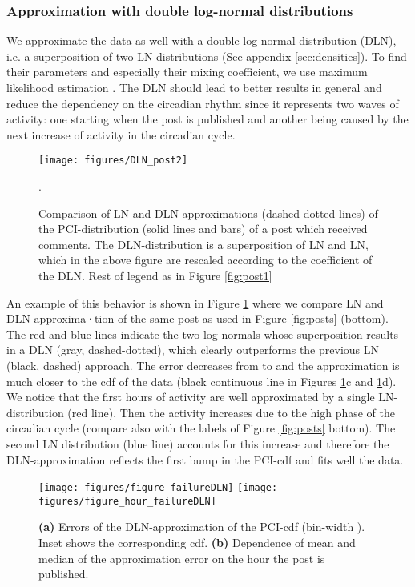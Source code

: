 \documentclass[twoside,11pt]{article}
\begin{document}
\subsubsection{Approximation with  double log-normal distributions}
\noindent 
We approximate the data as well with a double log-normal distribution
(DLN), i.e. a superposition of two LN-distributions (See appendix
\ref{sec:densities}).  To find their parameters and especially their
mixing coefficient, we use maximum likelihood estimation
\citep{Stouffer06, DeGroot2002}.  The DLN should lead to better results
in general and reduce the dependency on the circadian rhythm since it
represents two waves of activity: one starting when the post is
published and another being caused by the next increase of activity in
the circadian cycle.

\begin{figure}[!t]\centering
\texttt{[image: figures/DLN\_post2]}
\caption{Comparison of LN and DLN-approximations (dashed-dotted lines)
  of the PCI-distribution (solid lines and bars) of a post which
  received  comments.  The DLN-distribution is a superposition
  of LN and LN, which in the above figure are rescaled
  according to the coefficient  of the DLN. Rest of legend as in
  Figure \ref{fig:post1}}.
\label{fig:post_DLN}
\end{figure}


An example of this behavior is shown in Figure \ref{fig:post_DLN}
where we compare LN and DLN-ap\-prox\-i\-ma\-·tion of the same post as used in
Figure \ref{fig:posts} (bottom).  The red and blue lines indicate the
two log-normals whose superposition results in a DLN (gray,
dashed-dotted), which clearly outperforms the previous LN (black,
dashed) approach.  The error  decreases from  to
 and the approximation is much closer to the cdf of the data
(black continuous line in Figures \ref{fig:post_DLN}c and
\ref{fig:post_DLN}d). We notice that the first  hours of activity
are well approximated by a single LN-distribution (red line).
Then the activity increases due to the high phase of the circadian
cycle (compare also with the labels of Figure \ref{fig:posts} bottom).
The second LN distribution (blue line) accounts for this
increase and therefore the DLN-approximation reflects the first bump
in the PCI-cdf and fits well the data.

\begin{figure}[!tb]\centering
  \texttt{[image: figures/figure\_failureDLN]}
  \texttt{[image: figures/figure\_hour\_failureDLN]}
  \caption{\textbf{(a)} Errors  of the DLN-approximation of
    the PCI-cdf (bin-width ). Inset shows the corresponding
    cdf.  \textbf{(b)} Dependence of mean and median of the
    approximation error  on the hour the post is published.}
\label{fig:hour_failureDLN}
\label{fig:hist_failureDLN}
\end{figure}
\end{document}
